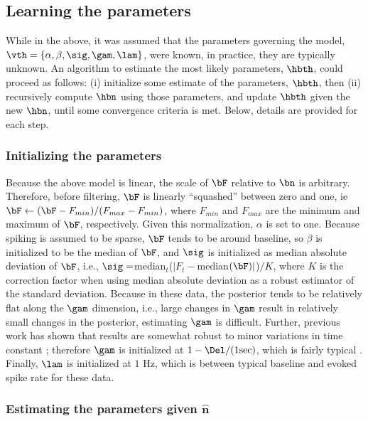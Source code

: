 \subsection{Learning the parameters} \label{sec:learn}

While in the above, it was assumed that the parameters governing the model, $\vth=\{\alpha, \beta, \sig, \gam, \lam\}$, were known, in practice, they are typically unknown. An algorithm to estimate the most likely parameters, $\hbth$, could proceed as follows: (i) initialize some estimate of the parameters, $\hbth$, then (ii) recursively compute $\hbn$ using those parameters, and update $\hbth$ given the new $\hbn$, until some convergence criteria is met.  Below, details are provided for each step.

\subsubsection{Initializing the parameters} \label{sec:init}

Because the above model is linear, the scale of $\bF$ relative to $\bn$ is arbitrary.  Therefore, before filtering, $\bF$ is linearly ``squashed'' between zero and one, ie $\bF \leftarrow (\bF - F_{min})/(F_{max}-F_{min})$, where $F_{min}$ and $F_{max}$ are the minimum and maximum of $\bF$, respectively.  Given this normalization, $\alpha$ is set to one.  Because spiking is assumed to be sparse, $\bF$ tends to be around baseline, so $\beta$ is initialized to be the median of $\bF$, and $\sig$ is initialized as median absolute deviation of $\bF$, i.e.,  $\sig=$median$_t$($|F_t-$median$(\bF)|$)$/K$, where $K$ is the correction factor when using median absolute deviation as a robust estimator of the standard deviation.  Because in these data, the posterior tends to be relatively flat along the $\gam$ dimension, i.e.,  large changes in $\gam$ result in relatively small changes in the posterior, estimating $\gam$ is difficult.  Further, previous work has shown that results are somewhat robust to minor variations in time constant \cite{YaksiFriedrich06}; therefore $\gam$ is initialized at $1-\Del/(1 \text{sec})$, which is fairly typical \cite{PologrutoSvoboda04}. Finally, $\lam$ is initialized at $1$ Hz, which is between typical baseline and evoked spike rate for these data.

\subsubsection{Estimating the parameters given $\widehat{\mathbf{n}}$} \label{sec:242}

